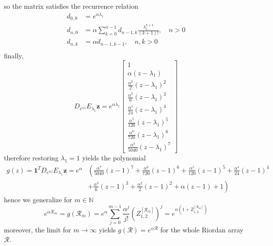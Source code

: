 so the matrix satisfies the recurrence relation
\begin{displaymath}
\begin{split}
d_{0,0}&=e^{\alpha \lambda_{1}}\\
d_{n,0}&=\alpha\sum_{k=0}^{n-1}{d_{n-1, k}\frac{\lambda_{1}^{k+1}}{(k+1)!}}, \quad n>0 \\
d_{n,k}&=\alpha d_{n-1, k-1}, \quad n,k > 0\\
\end{split}
\end{displaymath}
finally,
\begin{displaymath}
D_{e^{\alpha z}}E_{\lambda_{1}}\boldsymbol{z} = e^{\alpha \lambda_{1}}\left[\begin{matrix}1\\\alpha \left(z - \lambda_{1}\right) \\\frac{\alpha^{2}}{2} \left(z - \lambda_{1}\right)^{2} \\\frac{\alpha^{3}}{6} \left(z - \lambda_{1}\right)^{3} \\\frac{\alpha^{4}}{24} \left(z - \lambda_{1}\right)^{4} \\\frac{\alpha^{5}}{120} \left(z - \lambda_{1}\right)^{5} \\\frac{\alpha^{6}}{720} \left(z - \lambda_{1}\right)^{6} \\\frac{\alpha^{7}}{5040} \left(z - \lambda_{1}\right)^{7} \end{matrix}\right]
\end{displaymath}
therefore restoring $\lambda_{1}=1$ yields the polynomial
\begin{displaymath}
\begin{split}
g{\left (z \right )} = \boldsymbol{1}^{T}D_{e^{\alpha z}}E_{\lambda_{1}}\boldsymbol{z} = e^{\alpha} &\left(\frac{\alpha^{7} }{5040} \left(z - 1\right)^{7} + \frac{\alpha^{6} }{720} \left(z - 1\right)^{6} + \frac{\alpha^{5} }{120} \left(z - 1\right)^{5} + \frac{\alpha^{4} }{24} \left(z - 1\right)^{4}\right.\\
    &+ \left. \frac{\alpha^{3} }{6} \left(z - 1\right)^{3} + \frac{\alpha^{2} }{2} \left(z - 1\right)^{2} + \alpha \left(z - 1\right)  + 1\right)
\end{split}
\end{displaymath}
hence we generalize for $m\in\mathbb{N}$
\begin{displaymath}
e^{\alpha \mathcal{R}_{m}} = g{\left (\mathcal{R}_{m} \right )} =e^{\alpha} \sum_{j=0}^{m-1}{\frac{\alpha^{j}}{j!}{\left(Z_{1,2}^{[\mathcal{R}_{m}]}\right)^{j} }} = e^{\alpha\left(1+Z_{1,2}^{[\mathcal{R}_{m}]}\right)}
\end{displaymath}
moreover, the limit for $m \rightarrow \infty$ yields $ g{\left (\mathcal{R} \right )} = e^{\alpha \mathcal{R}} $ for the whole Riordan array $\mathcal{R}$.
\fi
